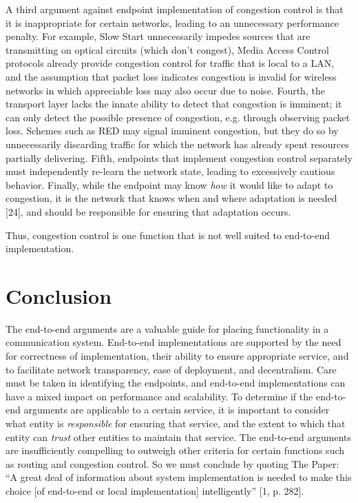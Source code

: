 \documentclass[a4paper,11pt,notitlepage,twoside,openright]{article}
\begin{document}
A third argument against endpoint implementation of congestion control
is that it is inappropriate for certain networks, leading to an
unnecessary performance penalty. For example, Slow Start unnecessarily
impedes sources that are transmitting on optical circuits (which don't
congest), Media Access Control protocols already provide congestion
control for traffic that is local to a LAN, and the assumption that
packet loss indicates congestion is invalid for wireless networks in
which appreciable loss may also occur due to noise. Fourth, the
transport layer lacks the innate ability to detect that congestion is
imminent; it can only detect the possible presence of congestion, e.g.
through observing packet loss. Schemes such as RED may signal imminent
congestion, but they do so by unnecessarily discarding traffic for which
the network has already spent resources partially delivering. Fifth,
endpoints that implement congestion control separately must
independently re-learn the network state, leading to excessively
cautious behavior. Finally, while the endpoint may know \emph{how} it
would like to adapt to congestion, it is the network that knows when and
where adaptation is needed {[}24{]}, and should be responsible for
ensuring that adaptation occurs.

Thus, congestion control is one function that is not well suited to
end-to-end implementation.

\hypertarget{conclusion}{%
\section{Conclusion}}

The end-to-end arguments are a valuable guide for placing functionality
in a communication system. End-to-end implementations are supported by
the need for correctness of implementation, their ability to ensure
appropriate service, and to facilitate network transparency, ease of
deployment, and decentralism. Care must be taken in identifying the
endpoints, and end-to-end implementations can have a mixed impact on
performance and scalability. To determine if the end-to-end arguments
are applicable to a certain service, it is important to consider what
entity is \emph{responsible} for ensuring that service, and the extent
to which that entity can \emph{trust} other entities to maintain that
service. The end-to-end arguments are insufficiently compelling to
outweigh other criteria for certain functions such as routing and
congestion control. So we must conclude by quoting The Paper: ``A great
deal of information about system implementation is needed to make this
choice {[}of end-to-end or local implementation{]} intelligently'' {[}1,
p. 282{]}.
\end{document}
